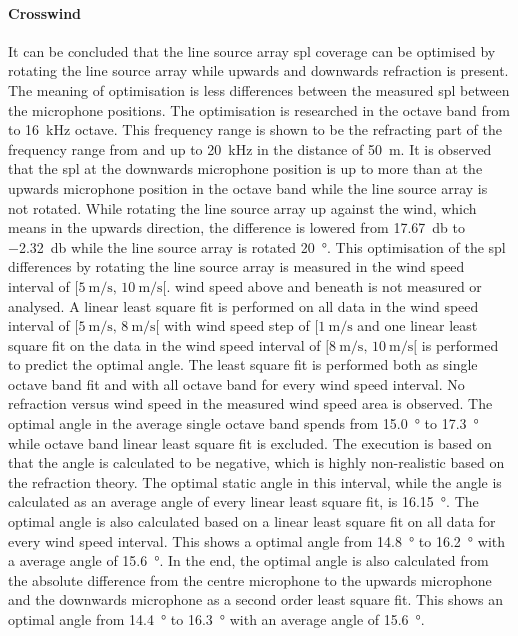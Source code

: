 \paragraph{Crosswind}
It can be concluded that the line source array \gls{spl} coverage can be optimised by rotating the line source array while upwards and downwards refraction is present. The meaning of optimisation is less differences between the measured \gls{spl} between the microphone positions. The optimisation is researched in the octave band from  to \SI{16}{\kilo\hertz} octave. This frequency range is shown to be the refracting part of the frequency range from  and up to \SI{20}{\kilo\hertz} in the distance of \SI{50}{\meter}. It is observed that the \gls{spl} at the downwards microphone position is up to  more than at the upwards microphone position in the  octave band while the line source array is not rotated. While rotating the line source array up against the wind, which means in the upwards direction, the difference is lowered from \SI{17.67}{\decibel}  to \SI{-2.32}{\decibel} while the line source array is rotated \SI{20}{\degree}. This optimisation of the \gls{spl} differences by rotating the line source array is measured in the wind speed interval of $[\SI{5}{\meter\per\second},\, \SI{10}{\meter\per\second}[ $. wind speed above and beneath is not measured or analysed. A linear least square fit is performed on all data in the wind speed interval of $[\SI{5}{\meter\per\second},\, \SI{8}{\meter\per\second}[ $ with wind speed step of $[\SI{1}{\meter\per\second}$ and one linear least square fit on the data in the wind speed interval of $[\SI{8}{\meter\per\second},\, \SI{10}{\meter\per\second}[ $ is performed to predict the optimal angle. The least square fit is performed both as single octave band fit and with all octave band for every wind speed interval. No refraction versus wind speed in the measured wind speed area is observed. The optimal angle in the average single octave band spends from \SI{15.0}{\degree} to \SI{17.3}{\degree} while  octave band linear least square fit is excluded. The execution is based on that the angle is calculated to be negative, which is highly non-realistic based on the refraction theory. The optimal static angle in this interval, while the angle is calculated as an average angle of every linear least square fit, is \SI{16.15}{\degree}. The optimal angle is also calculated based on a linear least square fit on all data for every wind speed interval. This shows a optimal angle from \SI{14.8}{\degree} to \SI{16.2}{\degree} with a average angle of \SI{15.6}{\degree}. In the end, the optimal angle is also calculated from the absolute difference from the centre microphone to the upwards microphone and the downwards microphone as a second order least square fit. This shows an optimal angle from \SI{14.4}{\degree} to \SI{16.3}{\degree} with an average angle of \SI{15.6}{\degree}. 

